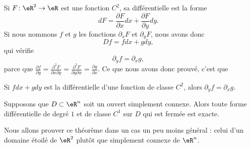 Si $F\colon \eR^2\to \eR$ est une fonction $C^2$, sa différentielle est la forme
\begin{equation}
    dF=\frac{ \partial F }{ \partial x }dx+\frac{ \partial F }{ \partial y }dy.
\end{equation}
Si nous nommons $f$ et $g$ les fonctions $\partial_xF$ et $\partial_yF$, nous avons donc
\begin{equation}
    Df=fdx+gdy,
\end{equation}
qui vérifie
\begin{equation}
    \partial_yf=\partial_xg,
\end{equation}
parce que $\frac{ \partial f }{ \partial y }=\frac{ \partial^2F  }{ \partial x\partial y }=\frac{ \partial^2F  }{ \partial y\partial x }=\frac{ \partial g }{ \partial x }$. Ce que nous avons donc prouvé, c'est que 
\begin{lemma}
Si $fdx+gdy$ est la différentielle d'une fonction de classe $C^2$, alors $\partial_yf=\partial_xg$.
\end{lemma}

\begin{theorem}        \label{ThoFermeExactFormRappel}
Supposons que $D\subset\eR^n$ soit un ouvert simplement connexe. Alors toute forme différentielle de degré $1$ et de classe $C^1$ sur $D$ qui est fermée est exacte.
\end{theorem}

Nous allons prouver ce théorème dans un cas un peu moins général : celui d'un domaine étoilé de \( \eR^2\) plutôt que simplement connexe de \( \eR^n\).

